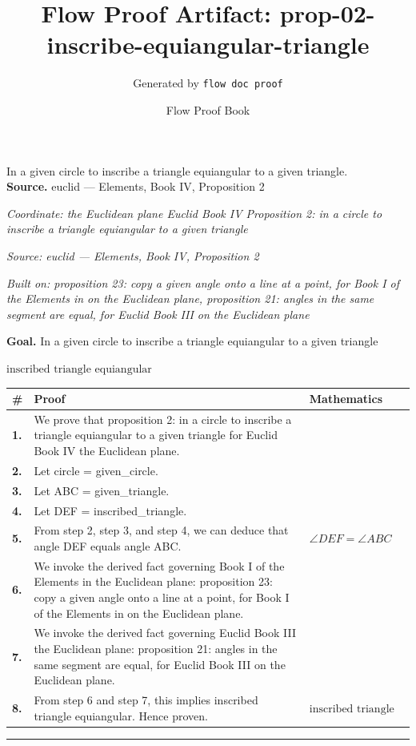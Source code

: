 \documentclass[11pt]{article}
\title{Flow Proof Artifact: prop-02-inscribe-equiangular-triangle}
\author{Generated by \texttt{flow doc proof}}
\date{Flow Proof Book}
\theoremstyle{definition}
\begin{document}
\maketitle
In a given circle to inscribe a triangle equiangular to a given triangle.\\[0.5em]
\textbf{Source.} euclid — Elements, Book IV, Proposition 2\\[0.5em]
\bigskip
{}\par
\smallskip\noindent\textit{Coordinate: the Euclidean plane \cdot Euclid Book IV \cdot Proposition 2: in a circle to inscribe a triangle equiangular to a given triangle}\par
\smallskip\noindent\textit{Source: euclid — Elements, Book IV, Proposition 2}\par
\smallskip\noindent\textit{Built on: proposition 23: copy a given angle onto a line at a point, for Book I of the Elements in on the Euclidean plane, proposition 21: angles in the same segment are equal, for Euclid Book III on the Euclidean plane}\par
\medskip
\noindent\textbf{Goal.} In a given circle to inscribe a triangle equiangular to a given triangle\par
\noindent$\displaystyle \text{inscribed triangle equiangular}$\par
\medskip
\noindent
\begin{tabular}{@{} >{\raggedright\arraybackslash}p{} >{\raggedright\arraybackslash}p{} >{\raggedleft\arraybackslash}p{} @{}}
\textbf{\#} & \textbf{Proof} & \textbf{Mathematics} \\
\midrule
\textbf{1.} & We prove that proposition 2: in a circle to inscribe a triangle equiangular to a given triangle for Euclid Book IV the Euclidean plane. & \\[0.45em]
\textbf{2.} & Let circle = given\_circle. & \\[0.45em]
\textbf{3.} & Let ABC = given\_triangle. & \\[0.45em]
\textbf{4.} & Let DEF = inscribed\_triangle. & \\[0.45em]
\textbf{5.} & From step 2, step 3, and step 4, we can deduce that angle DEF equals angle ABC. & $\displaystyle \angle DEF = \angle ABC$ \\[0.45em]
\textbf{6.} & We invoke the derived fact governing Book I of the Elements in the Euclidean plane: proposition 23: copy a given angle onto a line at a point, for Book I of the Elements in on the Euclidean plane. & \\[0.45em]
\textbf{7.} & We invoke the derived fact governing Euclid Book III the Euclidean plane: proposition 21: angles in the same segment are equal, for Euclid Book III on the Euclidean plane. & \\[0.45em]
\textbf{8.} & From step 6 and step 7, this implies inscribed triangle equiangular. Hence proven. & $\displaystyle \text{inscribed triangle equiangular}$ \\[0.45em]
\bottomrule
\end{tabular}
\label{thm:Geometry-Euclid Book IV-proposition_2_in_a_circle_to_inscribe_a_triangle_equiangular_to_a_given_triangle}
\par\medskip\hrule
\end{document}
